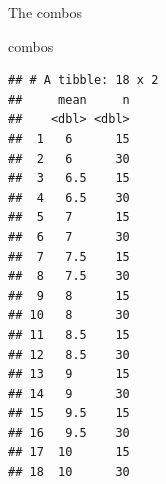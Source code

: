 \documentclass[ignorenonframetext,]{beamer}
\newenvironment{Shaded}{\begin{snugshade}}{\end{snugshade}}
\newcommand{\NormalTok}[1]{#1}
\begin{document}
\begin{frame}[fragile]{The combos}
\protect\hypertarget{the-combos}{}

\begin{Shaded}
\begin{Highlighting}[]
\NormalTok{combos}
\end{Highlighting}
\end{Shaded}

\begin{verbatim}
## # A tibble: 18 x 2
##     mean     n
##    <dbl> <dbl>
##  1   6      15
##  2   6      30
##  3   6.5    15
##  4   6.5    30
##  5   7      15
##  6   7      30
##  7   7.5    15
##  8   7.5    30
##  9   8      15
## 10   8      30
## 11   8.5    15
## 12   8.5    30
## 13   9      15
## 14   9      30
## 15   9.5    15
## 16   9.5    30
## 17  10      15
## 18  10      30
\end{verbatim}

\end{frame}
\end{document}
